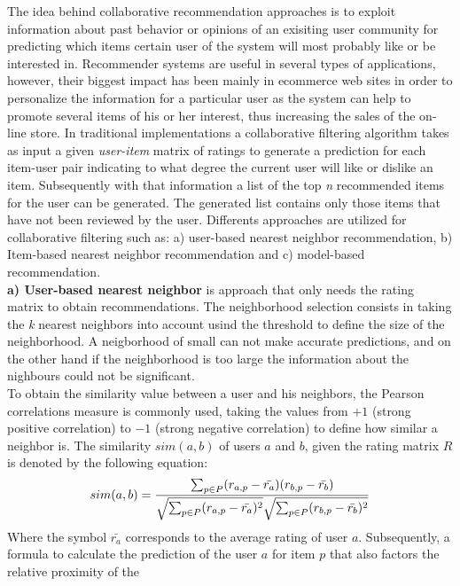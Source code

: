 The idea behind collaborative recommendation approaches is to exploit
information about past behavior or opinions of an exisiting user
community  for predicting which items certain user of the system will
most probably like or be interested in\cite{jannach2010recommender}. 
Recommender systems are useful in several types of  applications,
however, their biggest impact has been mainly in ecommerce  web sites
in order to personalize the information for a particular user as the
system can help to promote several items of his or her interest, thus
increasing the sales of the on-line store. In traditional
implementations a collaborative filtering algorithm takes as
input a given \textit{user-item} matrix of ratings to generate a
prediction for each item-user pair indicating to what degree the
current user will like or dislike an item. Subsequently with that
information a list of the top \textit{n} recommended items for the
user can be generated. The generated list contains only those items
that have not been reviewed by the user. Differents approaches are
utilized for collaborative filtering such as: a) user-based nearest 
neighbor recommendation, b) Item-based nearest neighbor 
recommendation and c) model-based recommendation.\\
\textbf{a) User-based nearest neighbor} is approach  that only 
needs the rating matrix to obtain recommendations. 
The neighborhood selection consists in taking
the \textit{k}  nearest neighbors into account usind the threshold to
define the size of the neighborhood. A neigborhood of small can not
make accurate predictions, and on the other hand if the neighborhood
is too large the information about the nighbours could not be
significant.\\ To obtain the similarity value between a user and his
neighbors, the Pearson correlations measure is commonly used, taking
the values from $+1$ (strong positive correlation) to $-1$ (strong
negative correlation) to define how similar a neighbor is. The
similarity $sim(a,b)$ of users $a$ and $b$, given the rating matrix
$R$ is denoted by the following equation:
\begin{equation}\label{eq:pearson1}
\displaystyle sim(a,b) = {\sum_{p \in P}(r_{a,p} - 
\bar{r_a})(r_{b,p}- \bar{r_b}) 
\over \sqrt{\sum_{p \in P}(r_{a,p} - \bar{r_a})^2} 
\sqrt{\sum_{p \in P} 
(r_{b,p}- \bar{r_b})^2}}
\end{equation}
Where the symbol $\bar{r_a}$ corresponds to the average rating of user
$a$. Subsequently, a formula to calculate the prediction of the user
$a$ for item $p$ that also factors the relative proximity of the
